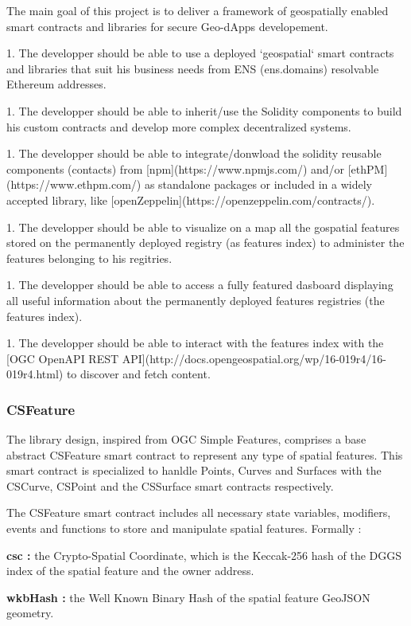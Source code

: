 \documentclass{isprs} %
\begin{document}
The main goal of this project is to deliver a framework of geospatially enabled smart contracts and libraries for secure Geo-dApps developement. 

1. The developper should be able to use a deployed `geospatial` smart contracts and libraries that suit his business needs from ENS (ens.domains) resolvable Ethereum addresses.

1. The developper should be able to inherit/use the Solidity components to build his custom contracts and develop more complex decentralized systems. 

1. The developper should be able to integrate/donwload the solidity reusable components (contacts) from [npm](https://www.npmjs.com/) and/or [ethPM](https://www.ethpm.com/) as standalone packages or included in a widely accepted library, like [openZeppelin](https://openzeppelin.com/contracts/).

1. The developper should be able to visualize on a map all the gospatial features stored on the permanently deployed registry (as features index) to administer the features belonging to his regitries.

1. The developper should be able to access a fully featured dasboard displaying all useful information about the permanently deployed features registries (the features index).   

1. The developper should be able to interact with the features index with the [OGC OpenAPI REST API](http://docs.opengeospatial.org/wp/16-019r4/16-019r4.html) to discover and fetch content.

\subsubsection{CSFeature}\label{sec:CSFeature}

The library design, inspired from OGC Simple Features, comprises a base abstract CSFeature smart contract to represent any type of spatial features. This smart contract is specialized to hanldle Points, Curves and Surfaces with the CSCurve, CSPoint and the CSSurface smart contracts respectively.

The CSFeature smart contract includes all necessary state variables, modifiers, events and functions to store and manipulate spatial features. Formally :

\textbf{csc :} the Crypto-Spatial Coordinate, which is the Keccak-256 hash of the DGGS index of the spatial feature and the owner address.

\textbf{wkbHash :} the Well Known Binary Hash of the spatial feature GeoJSON geometry.
\end{document}
